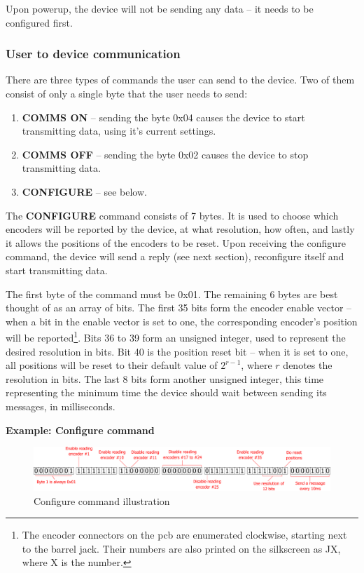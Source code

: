 \documentclass[twoside]{article}
\begin{document}
Upon powerup, the device will not be sending any data -- it needs to be configured first.

\subsubsection{User to device communication}

There are three types of commands the user can send to the device. Two of them consist of only a single byte that the user needs to send:

\begin{enumerate}
\item \textbf{COMMS ON} -- sending the byte 0x04 causes the device to start transmitting data, using it's current settings.
\item \textbf{COMMS OFF} -- sending the byte 0x02 causes the device to stop transmitting data.
\item \textbf{CONFIGURE} -- see below.
\end{enumerate}

The \textbf{CONFIGURE} command consists of 7 bytes. It is used to choose which encoders will be reported by the device, at what resolution, how often, and lastly it allows the positions of the encoders to be reset. Upon receiving the configure command, the device will send a reply (see next section), reconfigure itself and start transmitting data.

The first byte of the command must be 0x01. The remaining 6 bytes are best thought of as an array of bits. The first 35 bits form the encoder enable vector -- when a bit in the enable vector is set to one, the corresponding encoder's position will be reported\footnote{The encoder connectors on the pcb are enumerated clockwise, starting next to the barrel jack. Their numbers are also printed on the silkscreen as JX, where X is the number.}. Bits 36 to 39 form an unsigned integer, used to represent the desired resolution in bits. Bit 40 is the position reset bit -- when it is set to one, all positions will be reset to their default value of $2^{r-1}$, where $r$ denotes the resolution in bits. The last 8 bits form another unsigned integer, this time representing the minimum time the device should wait between sending its messages, in milliseconds.


\textbf{Example: Configure command}

\begin{figure}[htb]
	\centering
	\includegraphics[width=1.0\textwidth]{figs/bits}
	\caption{Configure command illustration}
	\label{fig:config}
\end{figure}
\end{document}
